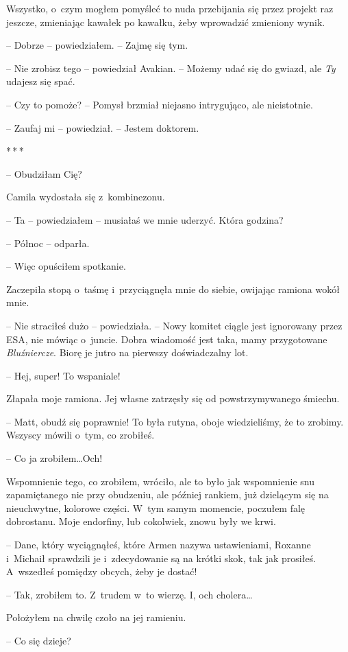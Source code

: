 \documentclass[oneside,polish,12pt,sfheadings]{mwbk}
\newcommand{\threeast}{\bigskip\par\centerline{*\,*\,*}\medskip\par}%
\begin{document}
Wszystko, o~czym mogłem pomyśleć to nuda przebijania się przez projekt
raz jeszcze, zmieniając kawałek po kawałku, żeby wprowadzić zmieniony
wynik.

-- Dobrze -- powiedziałem. -- Zajmę się tym.

-- Nie zrobisz tego -- powiedział Avakian. -- Możemy udać się do gwiazd,
ale \emph{Ty} udajesz się spać.

-- Czy to pomoże? -- Pomysł brzmiał niejasno intrygująco, ale nieistotnie.

-- Zaufaj mi -- powiedział. -- Jestem doktorem.

\threeast

-- Obudziłam Cię?

Camila wydostała się z~kombinezonu.

-- Ta -- powiedziałem -- musiałaś we mnie uderzyć. Która godzina?

-- Północ -- odparła.

-- Więc opuściłem spotkanie.

Zaczepiła stopą o~taśmę i~przyciągnęła mnie do siebie, owijając ramiona
wokół mnie.

-- Nie straciłeś dużo -- powiedziała. -- Nowy komitet ciągle jest
ignorowany przez ESA, nie mówiąc o~juncie. Dobra wiadomość jest taka,
mamy przygotowane \emph{Bluźniercze}. Biorę je jutro na pierwszy
doświadczalny lot.

-- Hej, super! To wspaniale!

Złapała moje ramiona. Jej własne zatrzęsły się od powstrzymywanego
śmiechu.

-- Matt, obudź się poprawnie! To była rutyna, oboje wiedzieliśmy, że to
zrobimy. Wszyscy mówili o~tym, co zrobiłeś.

-- Co ja zrobiłem\ldots Och!

Wspomnienie tego, co zrobiłem, wróciło, ale to było jak wspomnienie snu
zapamiętanego nie przy obudzeniu, ale później rankiem, już dzielącym się
na nieuchwytne, kolorowe części. W~tym samym momencie, poczułem falę
dobrostanu. Moje endorfiny, lub cokolwiek, znowu były we krwi.

-- Dane, który wyciągnąłeś, które Armen nazywa ustawieniami, Roxanne i~Michaił sprawdzili je i~zdecydowanie są na krótki skok, tak jak
prosiłeś. A~wszedłeś pomiędzy obcych, żeby je dostać!

-- Tak, zrobiłem to. Z~trudem w~to wierzę. I, och cholera\ldots

Położyłem na chwilę czoło na jej ramieniu.

-- Co się dzieje?
\end{document}
